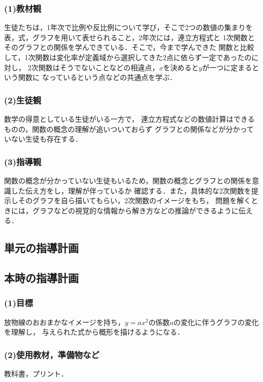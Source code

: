 \documentclass{ltjsarticle}
\begin{document}
  \subsubsection*{(1)教材観}
    生徒たちは，1年次で比例や反比例について学び，そこで2つの数値の集まりを
    表，式，グラフを用いて表せられること，2年次には，連立方程式と
    1次関数とそのグラフとの関係を学んできている．そこで，今まで学んできた
    関数と比較して，1次関数は変化率が定義域から選択してきた2点に依らず一定であったのに対し，
    2次関数はそうでないことなどの相違点，\(x\)を決めると\(y\)が一つに定まるという関数に
    なっているという点などの共通点を学ぶ．
  \subsubsection*{(2)生徒観}
    数学の得意としている生徒がいる一方で，
    連立方程式などの数値計算はできるものの，関数の概念の理解が追いついておらず
    グラフとの関係などが分かっていない生徒も存在する．
  \subsubsection*{(3)指導観}
    関数の概念が分かっていない生徒もいるため，関数の概念とグラフとの関係を意識した伝え方をし，理解が伴っているか
    確認する．また，具体的な2次関数を提示しそのグラフを自ら描いてもらい，2次関数のイメージをもち，
    問題を解くときには，グラフなどの視覚的な情報から解き方などの推論ができるように伝える．
\subsection{単元の指導計画}\vspace*{-3mm}

\subsection{本時の指導計画}\vspace*{-3mm}
  \subsubsection*{(1)目標}
    放物線のおおまかなイメージを持ち，\(y=ax^2\)の係数\(a\)の変化に伴うグラフの変化を理解し，
    与えられた式から概形を描けるようになる．
  \subsubsection*{(2)使用教材，準備物など}
    教科書，プリント．
\end{document}

